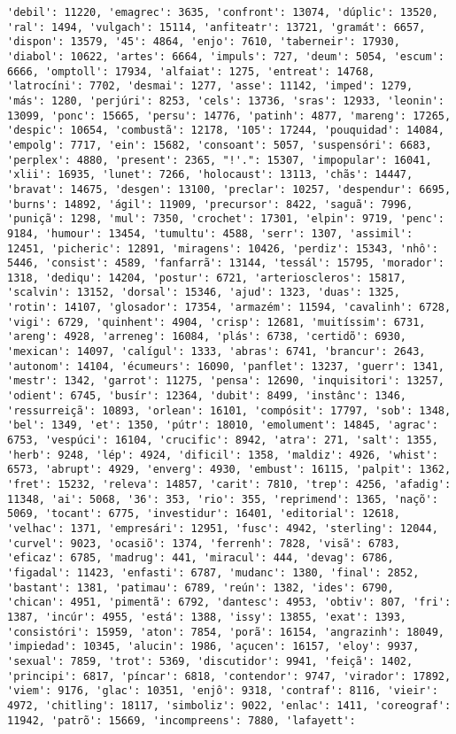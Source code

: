\begin{Verbatim}[commandchars=\\\{\}]
'debil': 11220, 'emagrec': 3635, 'confront': 13074, 'dúplic': 13520, 'ral': 1494, 'vulgach': 15114, 'anfiteatr': 13721, 'gramát': 6657, 'dispon': 13579, '45': 4864, 'enjo': 7610, 'taberneir': 17930, 'diabol': 10622, 'artes': 6664, 'impuls': 727, 'deum': 5054, 'escum': 6666, 'omptoll': 17934, 'alfaiat': 1275, 'entreat': 14768, 'latrocíni': 7702, 'desmai': 1277, 'asse': 11142, 'imped': 1279, 'más': 1280, 'perjúri': 8253, 'cels': 13736, 'sras': 12933, 'leonin': 13099, 'ponc': 15665, 'persu': 14776, 'patinh': 4877, 'mareng': 17265, 'despic': 10654, 'combustã': 12178, '105': 17244, 'pouquidad': 14084, 'empolg': 7717, 'ein': 15682, 'consoant': 5057, 'suspensóri': 6683, 'perplex': 4880, 'present': 2365, "!'.": 15307, 'impopular': 16041, 'xlii': 16935, 'lunet': 7266, 'holocaust': 13113, 'chãs': 14447, 'bravat': 14675, 'desgen': 13100, 'preclar': 10257, 'despendur': 6695, 'burns': 14892, 'ágil': 11909, 'precursor': 8422, 'saguã': 7996, 'puniçã': 1298, 'mul': 7350, 'crochet': 17301, 'elpin': 9719, 'penc': 9184, 'humour': 13454, 'tumultu': 4588, 'serr': 1307, 'assimil': 12451, 'picheric': 12891, 'miragens': 10426, 'perdiz': 15343, 'nhô': 5446, 'consist': 4589, 'fanfarrã': 13144, 'tessál': 15795, 'morador': 1318, 'dediqu': 14204, 'postur': 6721, 'arterioscleros': 15817, 'scalvin': 13152, 'dorsal': 15346, 'ajud': 1323, 'duas': 1325, 'rotin': 14107, 'glosador': 17354, 'armazém': 11594, 'cavalinh': 6728, 'vigi': 6729, 'quinhent': 4904, 'crisp': 12681, 'muitíssim': 6731, 'areng': 4928, 'arreneg': 16084, 'plás': 6738, 'certidõ': 6930, 'mexican': 14097, 'calígul': 1333, 'abras': 6741, 'brancur': 2643, 'autonom': 14104, 'écumeurs': 16090, 'panflet': 13237, 'guerr': 1341, 'mestr': 1342, 'garrot': 11275, 'pensa': 12690, 'inquisitori': 13257, 'odient': 6745, 'busír': 12364, 'dubit': 8499, 'instânc': 1346, 'ressurreiçã': 10893, 'orlean': 16101, 'compósit': 17797, 'sob': 1348, 'bel': 1349, 'et': 1350, 'pútr': 18010, 'emolument': 14845, 'agrac': 6753, 'vespúci': 16104, 'crucific': 8942, 'atra': 271, 'salt': 1355, 'herb': 9248, 'lép': 4924, 'dificil': 1358, 'maldiz': 4926, 'whist': 6573, 'abrupt': 4929, 'enverg': 4930, 'embust': 16115, 'palpit': 1362, 'fret': 15232, 'releva': 14857, 'carit': 7810, 'trep': 4256, 'afadig': 11348, 'ai': 5068, '36': 353, 'rio': 355, 'reprimend': 1365, 'naçõ': 5069, 'tocant': 6775, 'investidur': 16401, 'editorial': 12618, 'velhac': 1371, 'empresári': 12951, 'fusc': 4942, 'sterling': 12044, 'curvel': 9023, 'ocasiõ': 1374, 'ferrenh': 7828, 'visã': 6783, 'eficaz': 6785, 'madrug': 441, 'miracul': 444, 'devag': 6786, 'figadal': 11423, 'enfasti': 6787, 'mudanc': 1380, 'final': 2852, 'bastant': 1381, 'patimau': 6789, 'reún': 1382, 'ides': 6790, 'chican': 4951, 'pimentã': 6792, 'dantesc': 4953, 'obtiv': 807, 'fri': 1387, 'incúr': 4955, 'está': 1388, 'issy': 13855, 'exat': 1393, 'consistóri': 15959, 'aton': 7854, 'porã': 16154, 'angrazinh': 18049, 'impiedad': 10345, 'alucin': 1986, 'açucen': 16157, 'eloy': 9937, 'sexual': 7859, 'trot': 5369, 'discutidor': 9941, 'feiçã': 1402, 'principi': 6817, 'píncar': 6818, 'contendor': 9747, 'virador': 17892, 'viem': 9176, 'glac': 10351, 'enjô': 9318, 'contraf': 8116, 'vieir': 4972, 'chitling': 18117, 'simboliz': 9022, 'enlac': 1411, 'coreograf': 11942, 'patrõ': 15669, 'incompreens': 7880, 'lafayett': 
\end{Verbatim}

